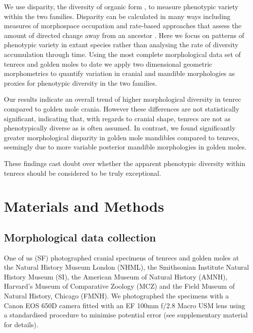 \documentclass[12pt,a4paper]{article}
\begin{document}
	We use disparity, the diversity of organic form \citep{Foote1997, Wills1994, Erwin2007}, to measure phenotypic variety within the two families. Disparity can be calculated in many ways including measures of morphospace occupation \citep[e.g.][]{Goswami2011, Brusatte2008} and rate-based approaches that assess the amount of directed change away from an ancestor \citep{OMeara2006, Price2013}. Here we focus on patterns of phenotypic variety in extant species rather than analysing the rate of diversity accumulation through time. 
	Using the most complete morphological data set of tenrecs and golden moles to date we apply two dimensional geometric morphometrics \citep{Rohlf1993, Adams2013} to quantify variation in cranial and mandible morphologies as proxies for phenotypic diversity in the two families. 

	Our results indicate an overall trend of higher morphological diversity in tenrec compared to golden mole crania. However these differences are not statistically significant, indicating that, with regards to cranial shape, tenrecs are not as phenotypically diverse as is often assumed. In contrast, we found significantly greater morphological disparity in golden mole mandibles compared to tenrecs, seemingly due to more variable posterior mandible morphologies in golden moles.
	
	These findings cast doubt over whether the apparent phenotypic diversity within tenrecs should be considered to be truly exceptional. 


\section{Materials and Methods}

\subsection{Morphological data collection} 

	
	One of us (SF) photographed cranial specimens of tenrecs and golden moles at the Natural History Museum London (NHML), the Smithsonian Institute Natural History Museum (SI), the American Museum of Natural History (AMNH), Harvard's Museum of Comparative Zoology (MCZ) and the Field Museum of Natural History, Chicago (FMNH). We photographed the specimens with a Canon EOS 650D camera fitted with an EF 100mm f/2.8 Macro USM lens using a standardised procedure to minimise potential error (see supplementary material for details). 
\end{document}
